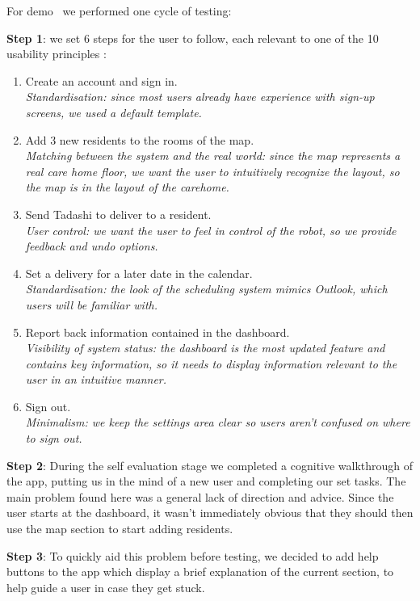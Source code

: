 \documentclass{article}
\begin{document}
For demo \demoNumber\ we performed one cycle of testing:

{\bf Step 1}: we set 6 steps for the user to follow, each relevant to one of the 10 usability principles \cite{heuristics}:
\begin{enumerate}
  \item Create an account and sign in. \\{\it Standardisation: since most users already have experience with sign-up screens, we used a default template.}
  \item Add 3 new residents to the rooms of the map. \\{\it Matching between the system and the real world: since the map represents a real care home floor, we want the user to intuitively recognize the layout, so the map is in the layout of the carehome.}
  \item Send Tadashi to deliver to a resident. \\{\it User control: we want the user to feel in control of the robot, so we provide feedback and undo options.}
  \item Set a delivery for a later date in the calendar. \\{\it Standardisation: the look of the scheduling system mimics Outlook, which users will be familiar with.}
  \item Report back information contained in the dashboard. \\{\it Visibility of system status: the dashboard is the most updated feature and contains key information, so it needs to display information relevant to the user in an intuitive manner.}
  \item Sign out. \\{\it Minimalism: we keep the settings area clear so users aren't confused on where to sign out.}
\end{enumerate}

{\bf Step 2}: During the self evaluation stage we completed a cognitive walkthrough of the app, putting us in the mind of a new user and completing our set tasks. The main problem found here was a general lack of direction and advice. Since the user starts at the dashboard, it wasn't immediately obvious that they should then use the map section to start adding residents.

{\bf Step 3}: To quickly aid this problem before testing, we decided to add help buttons to the app which display a brief explanation of the current section, to help guide a user in case they get stuck.
\end{document}
